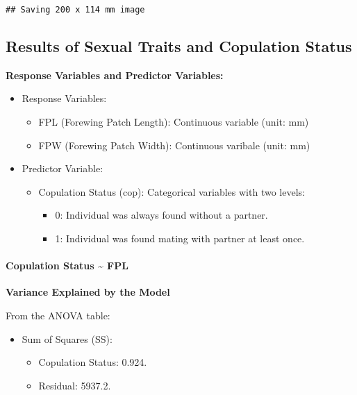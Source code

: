\documentclass[
]{article}
\providecommand{\tightlist}{%
  \setlength{\itemsep}{0pt}\setlength{\parskip}{0pt}}
\begin{document}
\begin{verbatim}
## Saving 200 x 114 mm image
\end{verbatim}

\hypertarget{results-of-sexual-traits-and-copulation-status}{%
\subsection{Results of Sexual Traits and Copulation
Status}\label{results-of-sexual-traits-and-copulation-status}}

\textbf{Response Variables and Predictor Variables:}

\begin{itemize}
\item
  Response Variables:

  \begin{itemize}
  \tightlist
  \item
    FPL (Forewing Patch Length): Continuous variable (unit: mm)
  \item
    FPW (Forewing Patch Width): Continuous varibale (unit: mm)
  \end{itemize}
\item
  Predictor Variable:

  \begin{itemize}
  \tightlist
  \item
    Copulation Status (cop): Categorical variables with two levels:

    \begin{itemize}
    \tightlist
    \item
      0: Individual was always found without a partner.
    \item
      1: Individual was found mating with partner at least once.
    \end{itemize}
  \end{itemize}
\end{itemize}

\hypertarget{copulation-status-fpl}{%
\paragraph{Copulation Status \textasciitilde{}
FPL}\label{copulation-status-fpl}}

\textbf{Variance Explained by the Model}

From the ANOVA table:

\begin{itemize}
\item
  Sum of Squares (SS):

  \begin{itemize}
  \tightlist
  \item
    Copulation Status: 0.924.
  \item
    Residual: 5937.2.
  \end{itemize}
\end{itemize}
\end{document}

